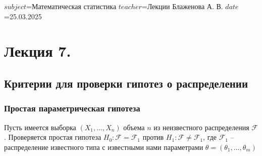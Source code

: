 $subject$=Математическая статистика
$teacher$=Лекции Блаженова А. В.
$date$=25.03.2025

\section{Лекция 7.}

\subsection{Критерии для проверки гипотез о распределении}

\subsubsection{Простая параметрическая гипотеза}

Пусть имеется выборка $(X_1, \dots, X_n)$ объема $n$ из неизвестного распределения $\mathcal{F}$. 
Проверяется простая гипотеза $H_0 : \mathcal{F} = \mathcal{F}_1$ против $H_1 : \mathcal{F} \neq \mathcal{F}_1$, где $\mathcal{F}_1$ -- распределение известного типа с 
известными нами параметрами $\theta = (\theta_1, \dots, \theta_m)$

